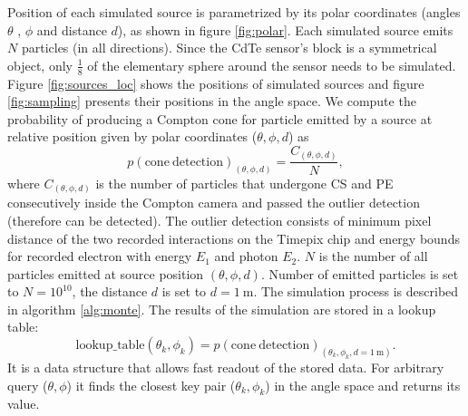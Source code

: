 Position of each simulated source is parametrized by its polar coordinates (angles $\theta$ , $\phi$ and distance $d$), as shown in figure \ref{fig:polar}.
Each simulated source emits $N$ particles (in all directions).
Since the \ac{CdTe} sensor's block is a symmetrical object, only $\frac{1}{8}$ of the elementary sphere around the sensor needs to be simulated.
Figure \ref{fig:sources_loc} shows the positions of simulated sources and figure \ref{fig:sampling} presents their positions in the angle space.
We compute the probability of producing a Compton cone for particle emitted by a source at relative position given by polar coordinates ($\theta, \phi, d$) as
\begin{equation}
  p(\mathrm{cone\ detection})_{(\theta, \phi, d)} = \frac{C_{(\theta, \phi, d)}}{N},
\end{equation} 
where $C_{(\theta, \phi, d)}$ is the number of particles that undergone \ac{CS} and \ac{PE} consecutively inside the Compton camera and passed the outlier detection (therefore can be detected).
The outlier detection consists of minimum pixel distance of the two recorded interactions on the Timepix chip and energy bounds for recorded electron with energy $E_{1}$ and photon $E_{2}$. 
$N$ is the number of all particles emitted at source position $(\theta, \phi, d)$. 
Number of emitted particles is set to $N = 10^{10}$, the distance $d$ is set to $d = \SI{1}\meter$.
The simulation process is described in algorithm \ref{alg:monte}. 
The results of the simulation are stored in a lookup table:
\begin{equation}
  \mathrm{lookup\_table}(\theta_{k}, \phi_{k}) = p(\mathrm{cone\ detection})_{(\theta_{k}, \phi_{k}, d = \SI{1}\meter)}. 
\end{equation}
It is a data structure that allows fast readout of the stored data.
For arbitrary query ($\theta, \phi$) it finds the closest key pair ($\theta_{k}, \phi_{k}$) in the angle space and returns its value.%

